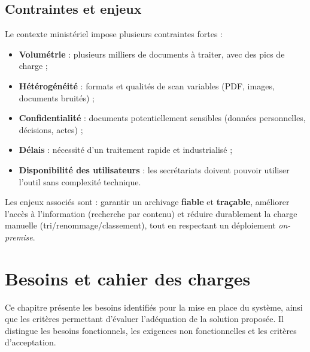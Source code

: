 \documentclass[12pt,a4paper]{report}
\begin{document}
\section{Contraintes et enjeux}
Le contexte ministériel impose plusieurs contraintes fortes :
\begin{itemize}
  \item \textbf{Volumétrie} : plusieurs milliers de documents à traiter, avec des pics de charge ;
  \item \textbf{Hétérogénéité} : formats et qualités de scan variables (PDF, images, documents bruités) ;
  \item \textbf{Confidentialité} : documents potentiellement sensibles (données personnelles, décisions, actes) ;
  \item \textbf{Délais} : nécessité d’un traitement rapide et industrialisé ;
  \item \textbf{Disponibilité des utilisateurs} : les secrétariats doivent pouvoir utiliser l’outil sans complexité technique.
\end{itemize}

Les enjeux associés sont : garantir un archivage \textbf{fiable} et \textbf{traçable}, améliorer l’accès à l’information (recherche par contenu) et réduire durablement la charge manuelle (tri/renommage/classement), tout en respectant un déploiement \textit{on-premise}.

\chapter{Besoins et cahier des charges}
Ce chapitre présente les besoins identifiés pour la mise en place du système, ainsi que les critères permettant d’évaluer l’adéquation de la solution proposée. Il distingue les besoins fonctionnels, les exigences non fonctionnelles et les critères d’acceptation.
\end{document}
